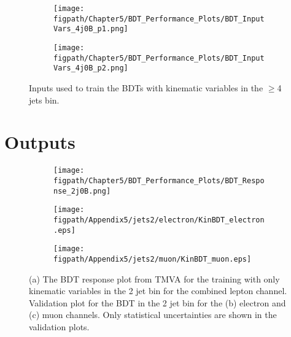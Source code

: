\begin{figure}[!hbt]
    \centering
    \begin{subfigure}[t]{0.93\textwidth}
        \texttt{[image: \\figpath/Chapter5/BDT\_Performance\_Plots/BDT\_InputVars\_4j0B\_p1.png]}
        \caption{}
        \label{fig:BDT_InputVars_4j0B_p1}
    \end{subfigure}

    \begin{subfigure}[t]{0.93\textwidth}
        \texttt{[image: \\figpath/Chapter5/BDT\_Performance\_Plots/BDT\_InputVars\_4j0B\_p2.png]}
        \caption{}
        \label{fig:BDT_InputVars_4j0B_p2}
    \end{subfigure}
    \caption{Inputs used to train the BDTs with kinematic variables in the $\geqslant$4 jets bin.}
    \label{fig:BDT_InputVars_4j0B}
\end{figure}
\clearpage
















\section{Outputs}
\label{appendix:BDT_Outputs}
\begin{figure}[!hbt]
    \centering
    \begin{subfigure}[t]{0.317\textwidth}
        \texttt{[image: \\figpath/Chapter5/BDT\_Performance\_Plots/BDT\_Response\_2j0B.png]}
        \caption{}
        \label{fig:BDT_Response_2j0B_TMVA}
    \end{subfigure}
    \begin{subfigure}[t]{0.317\textwidth}
        \texttt{[image: \\figpath/Appendix5/jets2/electron/KinBDT\_electron.eps]}
        \caption{}
        \label{fig:KinBDT_jets2_electron_noSys}
    \end{subfigure}
    \begin{subfigure}[t]{0.317\textwidth}
        \texttt{[image: \\figpath/Appendix5/jets2/muon/KinBDT\_muon.eps]}
        \caption{}
        \label{fig:KinBDT_jets2_muon_noSys}
    \end{subfigure}
    \caption{(a) The BDT response plot from TMVA for the training with only kinematic variables in the 2 jet bin for the combined lepton channel. Validation plot for the BDT in the 2 jet bin for the (b) electron and (c) muon channels. Only statistical uncertainties are shown in the validation plots.}
    \label{fig:KinBDT_Comparison_jets2}
\end{figure}

